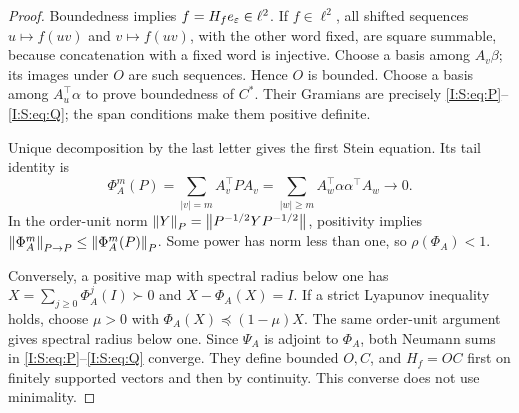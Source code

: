 \begin{proof}
Boundedness implies $f=H_f e_\varepsilon\in\ell^2$. If $f\in\ell^2$, all shifted sequences $u\mapsto f(uv)$ and $v\mapsto f(uv)$, with the other word fixed, are square summable, because concatenation with a fixed word is injective. Choose a basis among $A_v\beta$; its images under $O$ are such sequences. Hence $O$ is bounded. Choose a basis among $A_u^\top\alpha$ to prove boundedness of $C^*$. Their Gramians are precisely \eqref{I:S:eq:P}--\eqref{I:S:eq:Q}; the span conditions make them positive definite.

Unique decomposition by the last letter gives the first Stein equation. Its tail identity is
\[
 \Phi_A^m(P)=\sum_{|v|=m}A_v^\top P A_v
           =\sum_{|w|\ge m}A_w^\top\alpha\alpha^\top A_w\longrightarrow0.
\]
In the order-unit norm $\left\lVert Y\right\rVert_P=\left\lVert P^{-1/2}YP^{-1/2}\right\rVert$, positivity implies
$\left\lVert\Phi_A^m\right\rVert_{P\to P}\le\left\lVert\Phi_A^m(P)\right\rVert_P$. Some power has norm less than one, so $\rho(\Phi_A)<1$.

Conversely, a positive map with spectral radius below one has $X=\sum_{j\ge0}\Phi_A^j(I)\succ0$ and $X-\Phi_A(X)=I$. If a strict Lyapunov inequality holds, choose $\mu>0$ with $\Phi_A(X)\preceq(1-\mu)X$. The same order-unit argument gives spectral radius below one. Since $\Psi_A$ is adjoint to $\Phi_A$, both Neumann sums in \eqref{I:S:eq:P}--\eqref{I:S:eq:Q} converge. They define bounded $O,C$, and $H_f=OC$ first on finitely supported vectors and then by continuity. This converse does not use minimality.
\end{proof}
